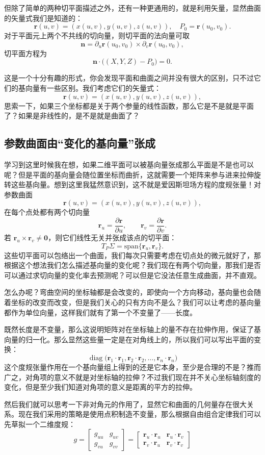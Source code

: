 \documentclass[UTF8]{ctexbook}
\begin{document}
但除了简单的两种切平面描述之外，还有一种更通用的，就是利用矢量，显然曲面的矢量式我们是知道的：
\[
\mathbf{r}(u,v)=(x(u,v),y(u,v),z(u,v)),\quad P_0=\mathbf{r}(u_0,v_0).
\]
对于平面元上两个不共线的切向量，则切平面的法向量可取
\[
\mathbf{n}=\partial_u \mathbf{r}(u_0,v_0)\times \partial_v \mathbf{r}(u_0,v_0),
\]
切平面方程为
\[
\mathbf{n}\cdot\bigl((X,Y,Z)-P_0\bigr)=0.
\]

这是一个十分有趣的形式，你会发现平面和曲面之间并没有很大的区别，只不过它们的基向量有一些区别。我们考虑它们的矢量式：
\[
\mathbf{r}(u,v)=(x(u,v),y(u,v),z(u,v)),
\]
思索一下，如果三个坐标都是关于两个参量的线性函数，那么它是不是就是平面了？如果是非线性的，是不是就是曲面了？

\subsection{参数曲面由“变化的基向量”张成}

学习到这里时候我在想，如果二维平面可以被基向量张成那么平面是不是也可以呢？但是平面的基向量会随位置坐标而曲折，这就需要一个矩阵来参与进来拉伸旋转这些基向量。想到这里我猛然意识到，这不就是爱因斯坦场方程的度规张量！对参数曲面
\[
\mathbf{r}(u,v)=(x(u,v),y(u,v),z(u,v)),
\]
在每个点处都有两个切向量
\[
\mathbf{r}_u=\frac{\partial \mathbf{r}}{\partial u},\qquad
\mathbf{r}_v=\frac{\partial \mathbf{r}}{\partial v}.
\]
若 $\mathbf{r}_u\times\mathbf{r}_v\neq\mathbf{0}$，则它们线性无关并张成该点的切平面：
\[
T_{P}\Sigma=\mathrm{span}\{\mathbf{r}_u,\mathbf{r}_v\}.
\]
这些切平面可以包络出一个曲面，我们每次只需要考虑在切点处的微元就好了，那根据这个想法我们怎么描述基向量的变化呢？我们现在有两个切向量，那我们是否可以通过求切向量的变化率去预测呢？可以但是它没法任意生成曲面，并不直观。

怎么办呢？弯曲空间的坐标轴都是会改变的，即使向一个方向移动，基向量也会随着坐标的改变而改变，但是我们关心的只有方向不是么？我们可以让考虑的基向量都作为单位向量，这样我们就有了第一个不变量了——长度。

既然长度是不变量，那么这说明矩阵对在坐标轴上的量不存在拉伸作用，保证了基向量的归一化。那么显然这些量一定是在对角线上的，所以我们可以写出平面的变换：
\[
\operatorname{diag}\!\bigl(\mathbf{r}_1\!\cdot\!\mathbf{r}_1,\mathbf{r}_2\!\cdot\!\mathbf{r}_2,\ldots,\mathbf{r}_n\!\cdot\!\mathbf{r}_n\bigr)
\]
这个度规张量作用在一个基向量组上得到的还是它本身，至少是合理的不是？推而广之，对角项的意义不就是对坐标轴的拉伸？不过我们现在并不关心坐标轴刻度的变化，但是至少我们知道对角项的意义是距离的平方的拉伸。

然后我们就可以思考一下非对角元的作用了，显然它和曲面的几何量存在很大关系。现在我们采用的策略是使用点积制造不变量，那么根据自由组合定律我们可以先草拟一个二维度规：
\[
    g = 
    \begin{bmatrix} 
    g_{uu} & g_{uv} \\ 
    g_{vu} & g_{vv} 
    \end{bmatrix} = 
    \begin{bmatrix} 
    \mathbf{r}_u \cdot \mathbf{r}_u & \mathbf{r}_u \cdot \mathbf{r}_v \\ 
    \mathbf{r}_v \cdot \mathbf{r}_u & \mathbf{r}_v \cdot \mathbf{r}_v 
    \end{bmatrix}
\]
\end{document}
